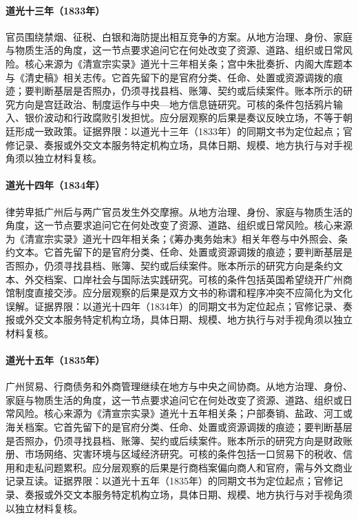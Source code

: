 \hypertarget{social:EQ-1833-OPIUM-POLICY-DEBATE}{}\paragraph{道光十三年（1833年）}官员围绕禁烟、征税、白银和海防提出相互竞争的方案。从地方治理、身份、家庭与物质生活的角度，这一节点要求追问它在何处改变了资源、道路、组织或日常风险。核心来源为《清宣宗实录》道光十三年相关条；宫中朱批奏折、内阁大库题本与《清史稿》相关志传。它首先留下的是官府分类、任命、处置或资源调拨的痕迹；要判断基层是否照办，仍须寻找县档、账簿、契约或后续案件。账本所示的研究方向是宫廷政治、制度运作与中央—地方信息链研究。可核的条件包括鸦片输入、银价波动和行政腐败引发担忧。应分层观察的后果是奏议反映立场，不等于朝廷形成一致政策。证据界限：以道光十三年（1833年）的同期文书为定位起点；官修记录、奏报或外交文本服务特定机构立场，具体日期、规模、地方执行与对手视角须以独立材料复核。
\hypertarget{social:EQ-1834-NAPIER-AFFAIR}{}\paragraph{道光十四年（1834年）}律劳卑抵广州后与两广官员发生外交摩擦。从地方治理、身份、家庭与物质生活的角度，这一节点要求追问它在何处改变了资源、道路、组织或日常风险。核心来源为《清宣宗实录》道光十四年相关条；《筹办夷务始末》相关年卷与中外照会、条约文本。它首先留下的是官府分类、任命、处置或资源调拨的痕迹；要判断基层是否照办，仍须寻找县档、账簿、契约或后续案件。账本所示的研究方向是条约文本、外交档案、口岸社会与国际法实践研究。可核的条件包括英国希望绕开广州商馆制度直接交涉。应分层观察的后果是双方文书的称谓和程序冲突不应简化为文化误解。证据界限：以道光十四年（1834年）的同期文书为定位起点；官修记录、奏报或外交文本服务特定机构立场，具体日期、规模、地方执行与对手视角须以独立材料复核。
\hypertarget{social:EQ-1835-GUANGZHOU-TRADE-REGULATION}{}\paragraph{道光十五年（1835年）}广州贸易、行商债务和外商管理继续在地方与中央之间协商。从地方治理、身份、家庭与物质生活的角度，这一节点要求追问它在何处改变了资源、道路、组织或日常风险。核心来源为《清宣宗实录》道光十五年相关条；户部奏销、盐政、河工或海关档案。它首先留下的是官府分类、任命、处置或资源调拨的痕迹；要判断基层是否照办，仍须寻找县档、账簿、契约或后续案件。账本所示的研究方向是财政账册、市场网络、灾害环境与区域经济研究。可核的条件包括一口贸易下的税收、信用和走私问题累积。应分层观察的后果是行商档案偏向商人和官府，需与外文商业记录互读。证据界限：以道光十五年（1835年）的同期文书为定位起点；官修记录、奏报或外交文本服务特定机构立场，具体日期、规模、地方执行与对手视角须以独立材料复核。
